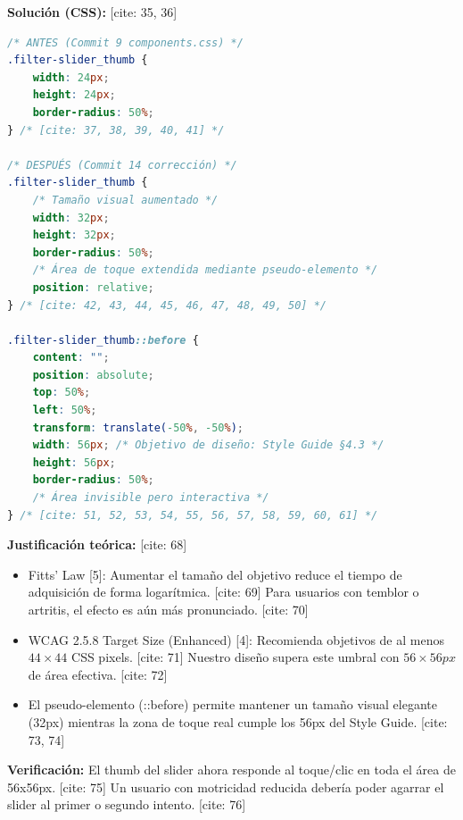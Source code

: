 \documentclass{article}
\begin{document}
\textbf{Solución (CSS):} [cite: 35, 36]
\begin{lstlisting}[language=CSS]
/* ANTES (Commit 9 components.css) */
.filter-slider_thumb {
    width: 24px;
    height: 24px;
    border-radius: 50%;
} /* [cite: 37, 38, 39, 40, 41] */

/* DESPUÉS (Commit 14 corrección) */
.filter-slider_thumb {
    /* Tamaño visual aumentado */
    width: 32px;
    height: 32px;
    border-radius: 50%;
    /* Área de toque extendida mediante pseudo-elemento */
    position: relative;
} /* [cite: 42, 43, 44, 45, 46, 47, 48, 49, 50] */

.filter-slider_thumb::before {
    content: "";
    position: absolute;
    top: 50%;
    left: 50%;
    transform: translate(-50%, -50%);
    width: 56px; /* Objetivo de diseño: Style Guide §4.3 */
    height: 56px;
    border-radius: 50%;
    /* Área invisible pero interactiva */
} /* [cite: 51, 52, 53, 54, 55, 56, 57, 58, 59, 60, 61] */
\end{lstlisting}

\textbf{Justificación teórica:} [cite: 68]
\begin{itemize}
    \item Fitts' Law [5]: Aumentar el tamaño del objetivo reduce el tiempo de adquisición de forma logarítmica. [cite: 69] Para usuarios con temblor o artritis, el efecto es aún más pronunciado. [cite: 70]
    \item WCAG 2.5.8 Target Size (Enhanced) [4]: Recomienda objetivos de al menos $44\times44$ CSS pixels. [cite: 71] Nuestro diseño supera este umbral con $56\times56px$ de área efectiva. [cite: 72]
    \item El pseudo-elemento (::before) permite mantener un tamaño visual elegante (32px) mientras la zona de toque real cumple los 56px del Style Guide. [cite: 73, 74]
\end{itemize}

\textbf{Verificación:} El thumb del slider ahora responde al toque/clic en toda el área de 56x56px. [cite: 75] Un usuario con motricidad reducida debería poder agarrar el slider al primer o segundo intento. [cite: 76]
\end{document}
